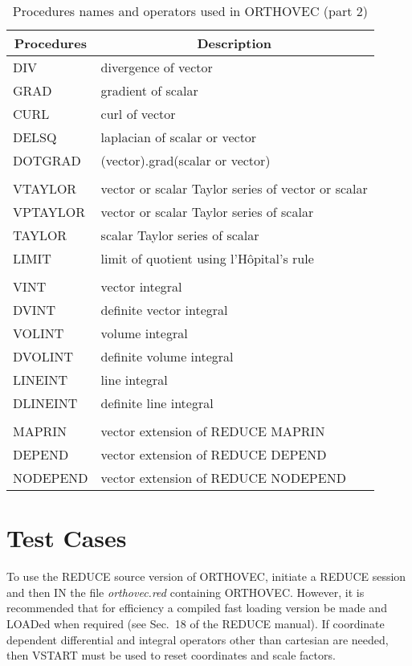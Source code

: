 \begin{table}
\begin{center}
\begin{tabular}{|l l|} \hline 
\multicolumn{1}{|c}{Procedures} & \multicolumn{1}{c|}{Description} \\ \hline 
DIV & divergence of vector \\ 
GRAD & gradient of scalar \\ 
CURL & curl of vector \\ 
DELSQ & laplacian of scalar or vector \\ 
DOTGRAD & (vector).grad(scalar or vector) \\ &  \\ 
VTAYLOR & vector or scalar Taylor series of vector or scalar \\ 
VPTAYLOR & vector or scalar Taylor series of scalar \\ 
TAYLOR & scalar Taylor series of scalar \\
LIMIT & limit of quotient using l'H\^opital's rule \\ &  \\
VINT & vector integral \\ 
DVINT & definite vector integral \\ 
VOLINT & volume integral \\ 
DVOLINT & definite volume integral \\ 
LINEINT & line integral \\ 
DLINEINT & definite line integral \\  & \\
MAPRIN & vector extension of REDUCE MAPRIN \\
DEPEND & vector extension of REDUCE DEPEND \\
NODEPEND & vector extension of REDUCE NODEPEND \\ \hline 
\end{tabular}
\end{center}
\caption{Procedures names and operators used in ORTHOVEC (part 2)}
\end{table}


\section{Test Cases}

To use the REDUCE source version of ORTHOVEC, initiate a REDUCE
session and then IN the file {\em orthovec.red} containing ORTHOVEC.
However, it is recommended that for efficiency a compiled fast loading
version be made and LOADed when required (see Sec.~18 of the REDUCE
manual).  If coordinate dependent differential and integral operators
other than cartesian are needed, then VSTART must be used to reset
coordinates and scale factors.

